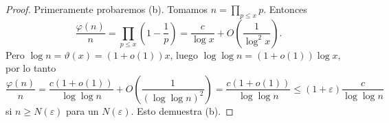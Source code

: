     \begin{proof}
        Primeramente probaremos (b). Tomamos $n=\prod_{p\leq x}p$. Entonces
        \begin{equation*}
            \frac{\varphi(n)}{n}=\prod_{p\leq x}\left(1-\frac{1}{p}\right)=\frac{c}{\log x}+O\left(\frac{1}{\log^2x}\right).
        \end{equation*}
        Pero $\log n=\vartheta(x)=(1+o(1))x$, luego $\log\log n=(1+o(1))\log x$, por lo tanto
        \begin{equation*}
            \frac{\varphi(n)}{n}=\frac{c(1+o(1))}{\log\log n}+O\left(\frac{1}{(\log\log n)^2}\right)=\frac{c(1+o(1))}{\log\log n}\leq(1+\varepsilon)\frac{c}{\log\log n}
        \end{equation*}
        si $n\geq N(\varepsilon)$ para un $N(\varepsilon)$. Esto demuestra (b).


\end{proof}
